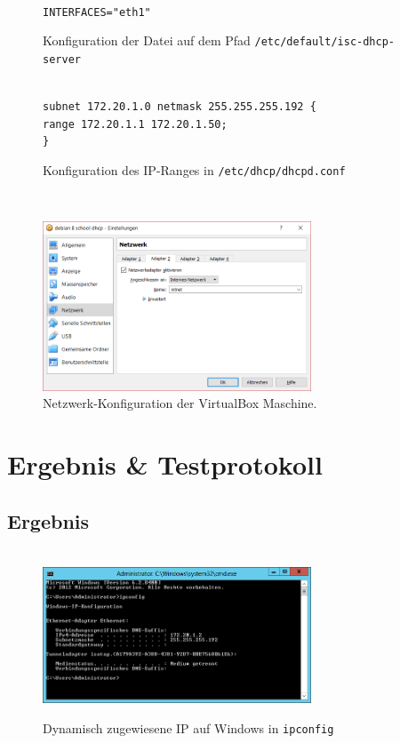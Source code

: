 \documentclass[12pt,a4paper,twoside,titlepage]{article}
\begin{document}
        

		\begin{figure}
			\hrulefill\\
			\texttt{INTERFACES="eth1"}
			\caption{\label{iscdhcpserver} Konfiguration der Datei auf dem Pfad \texttt{/etc/default/isc-dhcp-server}}
			\hrulefill
		\end{figure}
		
		\begin{figure}
			\hrulefill\\
			\texttt{subnet 172.20.1.0 netmask 255.255.255.192 \{\\\hspace*{8pt} range 172.20.1.1 172.20.1.50;\\\}}\\
			\caption{\label{dhcpdconf} Konfiguration des IP-Ranges in \texttt{/etc/dhcp/dhcpd.conf}}
			\hrulefill
		\end{figure}


		\begin{figure}
			\hrulefill\\
			\center
			
			\includegraphics[width=8cm]{vbox_network_config}
			\caption{\label{vboxconfig} Netzwerk-Konfiguration der VirtualBox Maschine.}
			\hrulefill
		\end{figure}

		\section{Ergebnis \& Testprotokoll}
		
		\subsection{Ergebnis}
		
        \begin{figure}
          \hrulefill\\
          \center
          \includegraphics[width=8cm]{cmd_ipconfig_dynamic_ip}
          \caption{\label{dynip} Dynamisch zugewiesene IP auf Windows in \texttt{ipconfig}}
          \hrulefill
        \end{figure}
\end{document}
